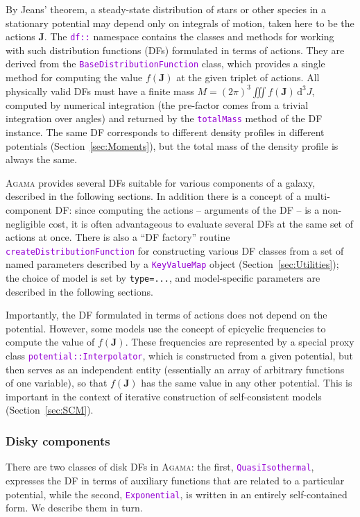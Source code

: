 \documentclass[12pt]{article}
\newcommand{\Agama}{\textsc{Agama}\xspace}
\newcommand{\ttt}[1]{\textcolor{darkviolet}{\texttt{#1}}}
\newcommand{\ppp}[1]{\textcolor{darkolive} {\texttt{#1}}}
\renewcommand{\d}{\mathrm{d}}
\newcommand{\bJ}{\boldsymbol{J}}
\begin{document}
By Jeans' theorem, a steady-state distribution of stars or other species in a stationary potential may depend only on integrals of motion, taken here to be the actions $\bJ$. The \ttt{df::} namespace contains the classes and methods for working with such distribution functions (DFs) formulated in terms of actions. They are derived from the \ttt{BaseDistributionFunction} class, which provides a single method for computing the value $f(\bJ)$ at the given triplet of actions. All physically valid DFs must have a finite mass $M = (2\pi)^3 \iiint f(\bJ)\,\d ^3J$, computed by numerical integration (the pre-factor comes from a trivial integration over angles) and returned by the \ttt{totalMass} method of the DF instance.
The same DF corresponds to different density profiles in different potentials (Section~\ref{sec:Moments}), but the total mass of the density profile is always the same.

\Agama provides several DFs suitable for various components of a galaxy, described in the following sections. In addition there is a concept of a multi-component DF: since computing the actions -- arguments of the DF -- is a non-negligible cost, it is often advantageous to evaluate several DFs at the same set of actions at once.
There is also a ``DF factory'' routine \ttt{createDistributionFunction} for constructing various DF classes from a set of named parameters described by a \ttt{KeyValueMap} object (Section~\ref{sec:Utilities}); the choice of model is set by \ppp{type=...}, and model-specific parameters are described in the following sections.

Importantly, the DF formulated in terms of actions does not depend on the potential. However, some models use the concept of epicyclic frequencies to compute the value of $f(\bJ)$. These frequencies are represented by a special proxy class \ttt{potential::Interpolator}, which is constructed from a given potential, but then serves as an independent entity (essentially an array of arbitrary functions of one variable), so that $f(\bJ)$ has the same value in any other potential. This is important in the context of iterative construction of self-consistent models (Section~\ref{sec:SCM}).


\subsubsection{Disky components}  \label{sec:DFdisk}

There are two classes of disk DFs in \Agama: the first, \ttt{QuasiIsothermal}, expresses the DF in terms of auxiliary functions that are related to a particular potential, while the second, \ttt{Exponential}, is written in an entirely self-contained form. We describe them in turn.
\end{document}
